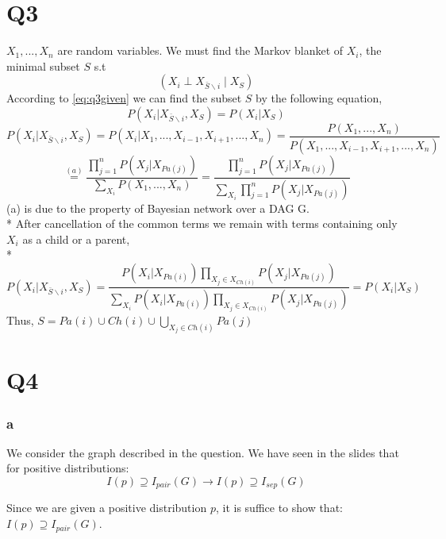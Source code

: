 \documentclass[11pt]{article}
\begin{document}
	\part*{Q3}
	$X_1,...,X_n$ are random variables.
	We must find the Markov blanket of $X_i$, the minimal subset $S$ s.t
	\begin{equation}\label{eq:q3given}
	\left( X_i \perp X_{\bar{S}\backslash i} \mid X_S \right)
	\end{equation}
	According to  \eqref{eq:q3given} we can find the subset $S$ by the following equation, 
	\begin{equation}
	\left. P(X_i|X_{\bar{S}\backslash i}, X_S) = P(X_i|X_S) \right.
	\end{equation}
	\begin{equation*}
	P(X_i|X_{\bar{S}\backslash i}, X_S) = P(X_i | X_1,...,X_{i-1},X_{i+1},...,X_n) = \frac{P(X_1,...,X_n)}{P(X_1,...,X_{i-1},X_{i+1},...,X_n)}
	\end{equation*}
	\begin{equation*}
	\overset{(a)}{=} \frac{\prod_{j=1}^n P(X_j|X_{Pa(j)})}{\sum_{X_i} P(X_1,...,X_n)} = \frac{\prod_{j=1}^n P(X_j|X_{Pa(j)})}{\sum_{X_i} \prod_{j=1}^n P(X_j|X_{Pa(j)})}
	\end{equation*}
	(a) is due to the property  of Bayesian network over a DAG G. \\*
	After cancellation of the common terms we remain with terms containing only $X_i$ as a child or a parent, \\*
	\begin{equation*}
		P(X_i|X_{\bar{S}\backslash i}, X_S) = \frac{P(X_i|X_{Pa(i)})\prod_{X_j\in X_{Ch(i)}} P(X_j|X_{Pa(j)})}{\sum_{X_i}P(X_i|X_{Pa(i)})\prod_{X_j\in X_{Ch(i)}} P(X_j|X_{Pa(j)})} = P(X_i|X_S)
	\end{equation*}
	Thus, $S = Pa(i) \cup Ch(i) \cup \bigcup_{X_j\in Ch(i)} Pa(j)$
\part*{Q4}
\section*{a}
We consider the graph described in the question.
We have seen in the slides that for positive distributions:
\begin{equation}\label{eq:q4a}
I(p)\supseteq I_{pair}(G) \rightarrow I(p)\supseteq I_{sep}(G)
\end{equation}

Since we are given a positive distribution $p$, it is suffice to show that:
$I(p)\supseteq I_{pair}(G)$.
\end{document}
